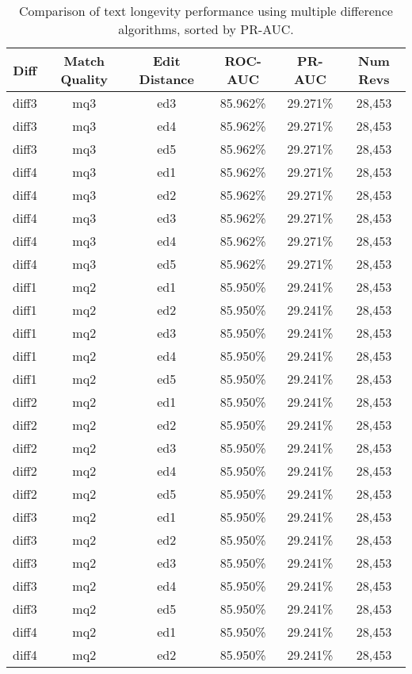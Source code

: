\begin{table}[tbph]
\begin{center}
\begin{tabular}{|c|c|c||c|c|c|}
\hline
Diff & Match Quality & Edit Distance & ROC-AUC & PR-AUC & Num Revs \\
\hline
\hline
diff3 & mq3 & ed3 & 85.962\% & 29.271\% & 28,453 \\
diff3 & mq3 & ed4 & 85.962\% & 29.271\% & 28,453 \\
diff3 & mq3 & ed5 & 85.962\% & 29.271\% & 28,453 \\
diff4 & mq3 & ed1 & 85.962\% & 29.271\% & 28,453 \\
diff4 & mq3 & ed2 & 85.962\% & 29.271\% & 28,453 \\
diff4 & mq3 & ed3 & 85.962\% & 29.271\% & 28,453 \\
diff4 & mq3 & ed4 & 85.962\% & 29.271\% & 28,453 \\
diff4 & mq3 & ed5 & 85.962\% & 29.271\% & 28,453 \\
diff1 & mq2 & ed1 & 85.950\% & 29.241\% & 28,453 \\
diff1 & mq2 & ed2 & 85.950\% & 29.241\% & 28,453 \\
diff1 & mq2 & ed3 & 85.950\% & 29.241\% & 28,453 \\
diff1 & mq2 & ed4 & 85.950\% & 29.241\% & 28,453 \\
diff1 & mq2 & ed5 & 85.950\% & 29.241\% & 28,453 \\
diff2 & mq2 & ed1 & 85.950\% & 29.241\% & 28,453 \\
diff2 & mq2 & ed2 & 85.950\% & 29.241\% & 28,453 \\
diff2 & mq2 & ed3 & 85.950\% & 29.241\% & 28,453 \\
diff2 & mq2 & ed4 & 85.950\% & 29.241\% & 28,453 \\
diff2 & mq2 & ed5 & 85.950\% & 29.241\% & 28,453 \\
diff3 & mq2 & ed1 & 85.950\% & 29.241\% & 28,453 \\
diff3 & mq2 & ed2 & 85.950\% & 29.241\% & 28,453 \\
diff3 & mq2 & ed3 & 85.950\% & 29.241\% & 28,453 \\
diff3 & mq2 & ed4 & 85.950\% & 29.241\% & 28,453 \\
diff3 & mq2 & ed5 & 85.950\% & 29.241\% & 28,453 \\
diff4 & mq2 & ed1 & 85.950\% & 29.241\% & 28,453 \\
diff4 & mq2 & ed2 & 85.950\% & 29.241\% & 28,453 \\
\hline
\end{tabular}
\end{center}
\caption{Comparison of text longevity performance using
    multiple difference algorithms, sorted by PR-AUC.}
\label{tab:textshout}
\end{table}
